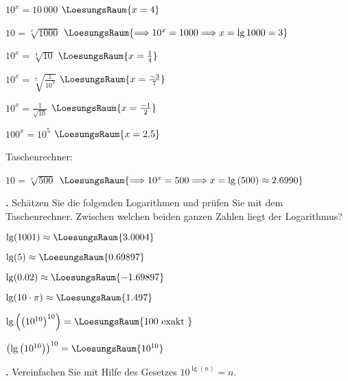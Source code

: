 \begin{bbwAufgabenBlock}
\item $10^x = 10\,000$ $\LoesungsRaum{x=4}$

\item $10 = \sqrt[x]{1000}$ $\LoesungsRaum{\Longrightarrow 10^x=1000 \Longrightarrow x=\lg{1000} = 3}$

\item $10^x = \sqrt[4]{10}$ $\LoesungsRaum{x=\frac14}$
\item $10^x = \sqrt[7]{\frac1{10^3}}$ $\LoesungsRaum{x=\frac{-3}{7}}$
\item $10^x = \frac{1}{\sqrt{10}}$ $\LoesungsRaum{x=\frac{-1}2}$
\item $100^x = 10^5$ $\LoesungsRaum{x=2.5}$

\vspace{2mm} Taschenrechner:
\item $10 = \sqrt[x]{500}$ $\LoesungsRaum{\Longrightarrow 10^x=500 \Longrightarrow x=\lg{}(500) \approx 2.6990}$


\end{bbwAufgabenBlock}

\newpage

\textbf{\bbwAufgabenNummer{}.}
Schätzen Sie die folgenden Logarithmen und prüfen Sie mit dem
Taschenrechner. Zwischen welchen beiden ganzen Zahlen liegt der Logarithmus?


\begin{bbwAufgabenBlock}
\item $\lg(1001) \approx  \LoesungsRaum{3.0004}$
\item $\lg(5) \approx  \LoesungsRaum{0.69897}$
\item $\lg(0.02) \approx  \LoesungsRaum{-1.69897}$
\item $\lg(10\cdot{}\pi) \approx  \LoesungsRaum{1.497}$\newpage
\item $\lg\left(\left(10^{10}\right)^{10}\right) =  \LoesungsRaum{100 \text{ exakt }}$
\item $\left(\lg\left(10^{10}\right)\right)^{10} =  \LoesungsRaum{10^{10}}$

\end{bbwAufgabenBlock}
\newpage

\textbf{\bbwAufgabenNummer{}.}
Vereinfachen Sie mit Hilfe des Gesetzes $10^{\lg(n)} = n$.


